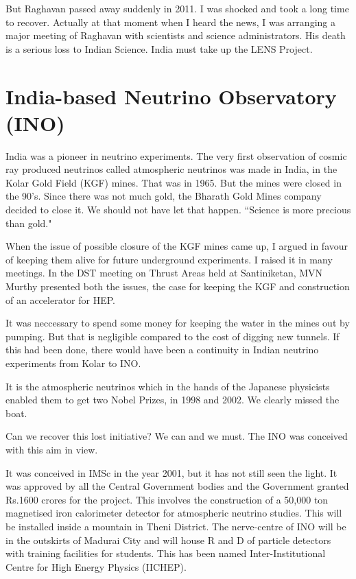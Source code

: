 But Raghavan passed away suddenly in 2011. I was shocked and took a long 
time to recover. Actually at that moment when I heard the news, I was 
arranging a major meeting of Raghavan with scientists and science 
administrators. His death is a serious loss to Indian Science. India 
must take up the LENS Project.

\vspace{-\topsep}
\section*{India-based Neutrino Observatory (INO)}

India was a pioneer in neutrino experiments. The very first obser\-vation 
of cosmic ray produced neutrinos called atmospheric neutrinos was made 
in India, in the Kolar Gold Field (KGF) mines. That was in 1965. But the 
mines were closed in the 90's. Since there was not much gold, the 
Bharath Gold Mines company decided to close it. We should not have let 
that happen. ``Science is more precious than gold."


When the issue of possible closure of the KGF mines came up, I argued in 
favour of keeping them alive for future underground experiments. I 
raised it in many meetings. In the DST meeting on Thrust Areas held at 
Santiniketan, MVN Murthy presented both the issues, the case for keeping 
the KGF and construction of an accelerator for HEP.


It was neccessary to spend some money for keeping the water in the mines 
out by pumping. But that is negligible compared to the cost of digging 
new tunnels. If this had been done, there would have been a continuity 
in Indian neutrino experiments from Kolar to INO.


It is the atmospheric neutrinos which in the hands of the Japanese 
physicists enabled them to get two Nobel Prizes, in 1998 and 2002. We 
clearly missed the boat.


Can we recover this lost initiative? We can and we must. The INO was 
conceived with this aim in view.


It was conceived in IMSc in the year 2001, but it has not still seen the 
light. It was approved by all the Central Government bodies and the 
Government granted Rs.1600 crores for the pro\-ject. This involves the 
construction of a 50,000 ton magnetised iron calorimeter detector for 
atmospheric neutrino studies. This will be installed inside a mountain 
in Theni District. The nerve-centre of INO will be in the outskirts of 
Madurai City and will house R and D of particle detectors with training 
facilities for students. This has been named Inter-Institutional Centre 
for High Energy Physics (IICHEP).

